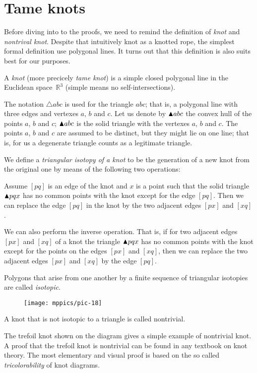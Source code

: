 \section{Tame knots}

Before diving into to the proofs, we need to remind the definition of \emph{knot} and \emph{nontrival knot}.
Despite that intuitively knot as a knotted rope,
the simplest formal definition use polygonal lines.
It turns out that this definition is also suits best for our purposes.

A \emph{knot} (more precicely \emph{tame knot}) is a simple closed polygonal line in the Euclidean space~$\mathbb{R}^3$ (simple means no self-intersections).

The notation $\triangle abc$ is used for the triangle $abc$; that is, a polygonal line with three edges and vertexes $a$, $b$ and $c$.
Let us denote by $\blacktriangle abc$ the convex hull of the points $a$, $b$ and $c$; $\blacktriangle abc$ is the solid triangle with the vertexes $a$, $b$ and $c$.
The points $a$, $b$ and $c$ are assumed to be distinct, but they might lie on one line;
that is, for us a degenerate triangle counts as a legitimate triangle.

We define a \emph{triangular isotopy of a knot} to be the generation of a new knot from the original one by means of the
following two operations:

Assume $[pq]$ is an edge of the knot and $x$
is a point such that the solid triangle $\blacktriangle pqx$  has no common points with the knot except for the edge $[pq]$.
Then we can replace the edge $[pq]$ in the knot by the two adjacent edges $[px]$ and $[xq]$.

We can also perform the inverse operation.
That is, if for two adjacent edges $[px]$ and $[xq]$ of a knot the triangle
$\blacktriangle pqx$ has no common points with the knot except for the points on the edges $[px]$ and $[xq]$,
then we can replace the two adjacent edges $[px]$ and $[xq]$ by the edge $[pq]$.

Polygons that arise from one another by a finite sequence of
triangular isotopies are called \emph{isotopic}.

\begin{wrapfigure}{r}{22 mm}
\vskip-4mm
\centering
\texttt{[image: mppics/pic-18]}
\vskip0mm
\end{wrapfigure}

A knot that is not isotopic to a triangle is called nontrivial.

The trefoil knot shown on the diagram gives a simple example of nontrivial knot.
A proof that the trefoil knot is nontrivial can be found in any textbook on knot theory.
The most elementary and visual proof is based on the so called \emph{tricolorability} of knot diagrams.   

